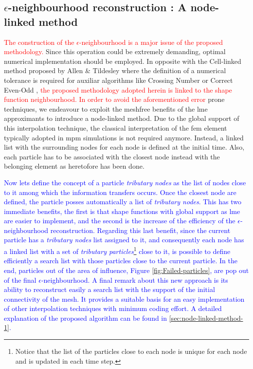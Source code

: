 \message{ !name(2020_EFM_MPM_Eigensoftening.tex)}\documentclass[preprint,12pt,a4paper]{elsarticle}
\newcommand{\PNA}[1]{
  \textcolor{red}{{#1}}
}
\newcommand{\MMP}[1]{
  \textcolor{blue}{{#1}}
}
\begin{document}
\subsection{$\epsilon$-neighbourhood reconstruction : A node-linked method}
\label{sec:epsil-neighb-reconst}
\PNA{The construction of the $\epsilon$-neighbourhood is a major issue of the proposed methodology.} Since this operation could be extremely demanding, optimal
numerical implementation should be employed. In opposite with the Cell-linked
method proposed by Allen \& Tildesley \cite{Allen_et_al_1989} where
the definition of a numerical tolerance is required for auxiliar
algorithms like Crossing Number \cite{Shimrat_1962} or Correct
Even-Odd \cite{Galetzka_et_al_2017}, \PNA{the proposed methodology adopted herein is linked to the shape function neighbourhood. In order to avoid the aforementioned error} prone
techniques, we endeavour to exploit the meshfree benefits of
the \acrshort{lme} approximants to introduce a node-linked method. Due
to the global support of this interpolation technique, the classical
interpretation of the \acrshort{fem} element typically adopted in
\acrshort{mpm} simulations is not required anymore. Instead, a linked
list with the surrounding nodes for each node is defined at the initial
time. Also, each particle has to be associated with the
closest node instead with the belonging element as heretofore has been
done.
\MMP{Now lets define the concept of a particle \textit{tributary nodes} as the
list of nodes close to it among which the information transfers
occurs. Once the closest node are defined, the particle
posses automatically a list of \textit{tributary nodes}. This has two
immediate benefits, the first is that shape functions with global
support as \acrshort{lme} are easier to implement,
and the second is the increase of the efficiency of the $\epsilon$-neighbourhood
reconstruction. Regarding this last benefit, since the current
particle has a \textit{tributary nodes} list assigned to it, and
consequently each node has a linked list with a set of
\textit{tributary particles}\footnote{Notice that the list of the
  particles close to each node is unique for each node and is updated
  in each time step.} close to it, is possible to define efficiently a
search list with those particles close to the current particle.
In the end, particles out of the area of influence, Figure
\ref{fig:Failed-particles}, are pop out of the final
$\epsilon$-neighbourhood. A final remark about this new approach is
its ability to reconstruct easily a search list with the support of
the initial connectivity of the mesh. It provides a suitable basis for
an easy implementation of other interpolation techniques with minimum
coding effort. A detailed explanation of the proposed algorithm can be
found in \ref{sec:node-linked-method-1}.}
\end{document}
